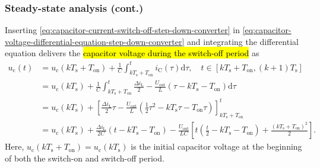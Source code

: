 \begin{frame}
    \frametitle{Steady-state analysis (cont.)}
    Inserting \eqref{eq:capacitor-current-switch-off-step-down-converter} in \eqref{eq:capacitor-voltage-differential-equation-step-down-converter} and integrating the differential equation delivers the \hl{capacitor voltage during the switch-off period} as
    \begin{equation}
        \begin{split}
            u_\mathrm{c}(t) &= u_\mathrm{c}(k T_\mathrm{s}+T_\mathrm{on}) + \frac{1}{C}\int_{k T_\mathrm{s}+T_\mathrm{on}}^t i_\mathrm{C}(\tau) \mathrm{d}\tau, \quad t\in [k T_\mathrm{s} + T_\mathrm{on}, (k+1) T_\mathrm{s}] \\
            &= u_\mathrm{c}(k T_\mathrm{s}) + \frac{1}{C}\int_{k T_\mathrm{s}+T_\mathrm{on}}^t \frac{\Delta i_\mathrm{L}}{2} - \frac{U_\mathrm{out}}{L} (\tau - k T_\mathrm{s} - T_\mathrm{on}) \mathrm{d}\tau\\
            & = u_\mathrm{c}(k T_\mathrm{s}) + \left[\frac{\Delta i_\mathrm{L}}{2}\tau - \frac{U_\mathrm{out}}{L} (\frac{1}{2}\tau^2 - k T_\mathrm{s}\tau - T_\mathrm{on}\tau) \right]_{k T_\mathrm{s}+T_\mathrm{on}}^t\\
            &= u_\mathrm{c}(k T_\mathrm{s}) + \frac{\Delta i_\mathrm{L}}{2 C}(t - k T_\mathrm{s} - T_\mathrm{on}) - \frac{U_\mathrm{out}}{LC} \left[t(\frac{t}{2} - k T_\mathrm{s} - T_\mathrm{on}) + \frac{(k T_\mathrm{s} + T_\mathrm{on})^2}{2}\right].
        \end{split}
        \label{eq:capacitor-voltage-switch-off-step-down-converter}
    \end{equation}
    Here, $u_\mathrm{c}(k T_\mathrm{s}+T_\mathrm{on})=u_\mathrm{c}(k T_\mathrm{s})$ is the initial capacitor voltage at the beginning of both the switch-on and switch-off period.
\end{frame}

